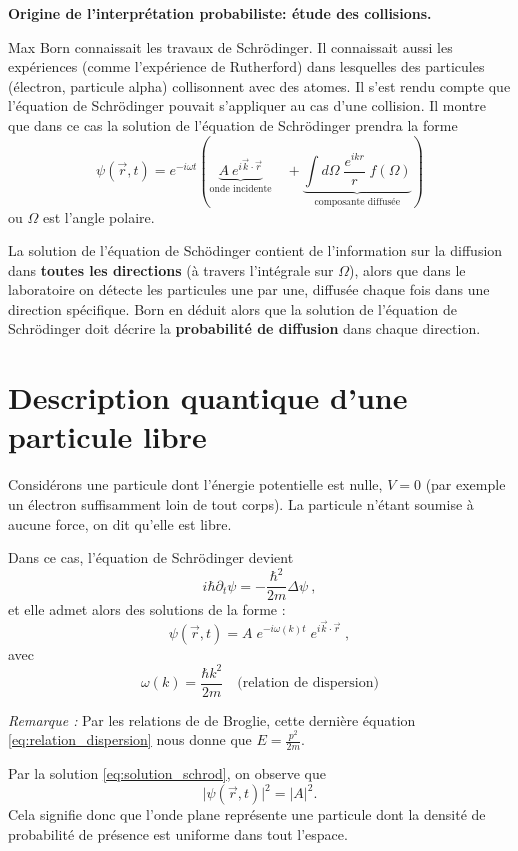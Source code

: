 \documentclass{book}
\begin{document}
{\bf Origine de l'interprétation probabiliste: étude des collisions.}{
Max Born connaissait les travaux de Schrödinger.
Il connaissait aussi les expériences (comme l'expérience de Rutherford) dans lesquelles des particules (électron, particule alpha) collisonnent avec des atomes. Il s'est rendu compte que l'équation de Schrödinger pouvait s'appliquer au cas d'une collision. Il montre que dans ce cas la solution de l'équation de Schrödinger prendra la forme
$$ \psi(\vec r,t) = e^{- i \omega t} \left( 
\underbrace{ A \ e^{i \vec k \cdot \vec r}}_{\text{onde incidente}} \quad + \underbrace{\int d \Omega \; \frac {e^{i  k  r}}{r} \; f(\Omega)}_{\text{composante diffusée}} \right)$$
ou $\Omega$ est l'angle polaire.

La solution de l'équation de Schödinger contient de l'information sur la diffusion dans \textbf{toutes les directions} (à travers l'intégrale sur $\Omega$),
alors que dans le laboratoire on détecte les particules une par une, diffusée chaque fois dans une direction spécifique.
Born en déduit alors que 
 la solution de l'équation de Schrödinger doit  décrire 
 la \textbf{probabilité de diffusion} dans chaque direction.}






\section{Description quantique d'une particule libre}
Considérons une particule dont l'énergie potentielle est nulle, $V=0$ (par exemple un électron suffisamment loin de tout corps). La particule n'étant soumise à aucune force, on dit qu'elle est libre.

Dans ce cas, l'équation de Schrödinger devient 
$$i \hbar \partial_t \psi = -\frac{\hbar^2}{2m} \Delta \psi\ ,$$ 
et elle admet alors des solutions de la forme : 
\begin{equation}\label{eq:solution_schrod}
\psi(\vec r, t) = A \; e^{-i\omega(k) t} \; e ^{i \vec k \cdot \vec r} \; ,
\end{equation}
avec 
\begin{equation}\label{eq:relation_dispersion}
\omega(k) = \dfrac{\hbar k^2}{2m} \quad \text{(relation de dispersion)}
\end{equation}

\textit{Remarque : } Par les relations de de Broglie, cette dernière équation \ref{eq:relation_dispersion} nous donne que $E = \frac{p^2}{2m}$. 

Par la solution \ref{eq:solution_schrod}, on observe que $$ \lvert \psi(\vec{r},t) \rvert^2 = \lvert A \rvert^2 .$$
Cela signifie donc que l'onde plane représente une particule dont la densité de probabilité de présence est uniforme dans tout l'espace. 
\end{document}
